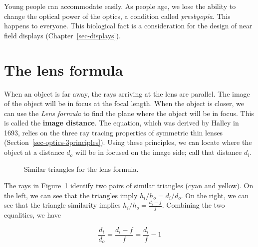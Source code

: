 \documentclass[
  letterpaper,
]{book}
\begin{document}
Young people can accommodate easily. As people age, we lose the ability
to change the optical power of the optics, a condition called
\emph{presbyopia}. This happens to everyone. This biological fact is a
consideration for the design of near field displays
(Chapter~\ref{sec-displays}).

\section{The lens formula}\label{sec-lens-formula}

When an object is far away, the rays arriving at the lens are parallel.
The image of the object will be in focus at the focal length. When the
object is closer, we can use the \emph{Lens formula} to find the plane
where the object will be in focus. This is called the \textbf{image
distance}. The equation, which was derived by Halley in 1693, relies on
the three ray tracing properties of symmetric thin lenses
(Section~\ref{sec-optics-3principles}). Using these principles, we can
locate where the object at a distance \(d_o\) will be in focused on the
image side; call that distance \(d_i\).

\begin{figure}


\caption{\label{fig-lensmaker-similartriangles}Similar triangles for the
lens formula.}

\end{figure}%

The rays in Figure~\ref{fig-lensmaker-similartriangles} identify two
pairs of similar triangles (cyan and yellow). On the left, we can see
that the triangles imply \(h_i/h_o = d_i/d_o\). On the right, we can see
that the triangle similarity implies \(h_i/h_o = \frac{d_i - f}{f}\).
Combining the two equalities, we have

\[\frac{d_i}{d_o} = \frac{d_i - f}{f} = \frac{d_i}{f} - 1 \]
\end{document}

